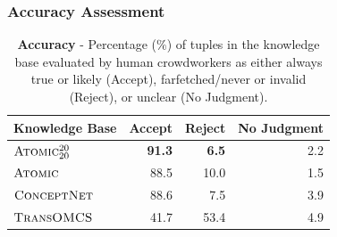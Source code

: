 \documentclass[10pt,aspectratio=43]{beamer}
\newcommand\atomic{\textsc{Atomic}\xspace}
\newcommand\atomicTT{\textsc{Atomic$^{20}_{20}$}\xspace}
\newcommand\transomcs{\textsc{TransOMCS}\xspace}
\newcommand\conceptnet{\textsc{ConceptNet}\xspace}
\begin{document}
    \begin{frame}
        \frametitle{\textbf{Accuracy Assessment}}
        \begin{table}[t]
                \center
                \small
                \begin{tabular}{lrrr}
                    \toprule
                    \textbf{Knowledge Base} & \textbf{Accept}	& \textbf{Reject}	&\textbf{No Judgment}\\
                    \midrule
                    $\atomicTT$   & \textbf{91.3} & \textbf{6.5} & 2.2\\
                    $\atomic$     & 88.5 & 10.0 & 1.5\\
                    $\conceptnet$ & 88.6 & 7.5 & 3.9\\
                    $\transomcs$  & 41.7 & 53.4 & 4.9\\
                    \bottomrule
                \end{tabular}
            \caption{\textbf{Accuracy} - Percentage ($\%$) of tuples in the knowledge base evaluated by human crowdworkers as either always true or likely (Accept), farfetched/never or invalid (Reject), or unclear (No Judgment).}
            \label{tab:precision-results}
        \end{table}
    \end{frame}
 
\end{document}

